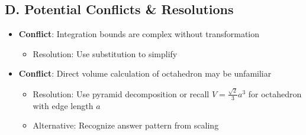 \documentclass[11pt]{article}
\begin{document}
\begin{conversionbox}
\subsection*{D. Potential Conflicts \& Resolutions}
\begin{itemize}[leftmargin=*]
    \item \textbf{Conflict}: Integration bounds are complex without transformation
    \begin{itemize}
        \item Resolution: Use substitution to simplify
    \end{itemize}
    \item \textbf{Conflict}: Direct volume calculation of octahedron may be unfamiliar
    \begin{itemize}
        \item Resolution: Use pyramid decomposition or recall $V = \frac{\sqrt{2}}{3}a^3$ for octahedron with edge length $a$
        \item Alternative: Recognize answer pattern from scaling
    \end{itemize}
\end{itemize}
\end{conversionbox}
\end{document}
